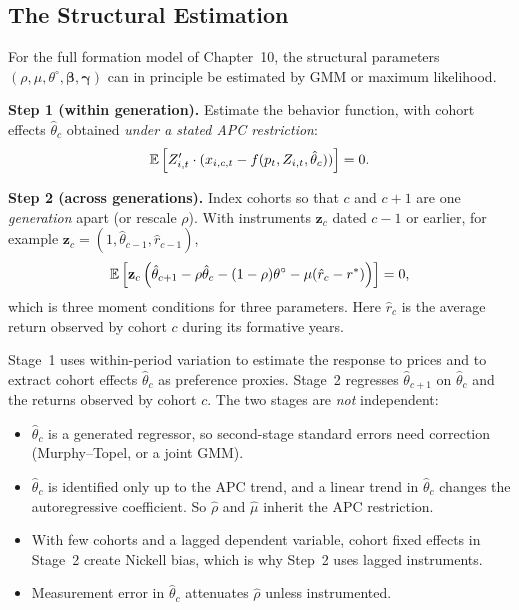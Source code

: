\documentclass[../structural_economics_book.tex]{subfiles}
\begin{document}
\subsection{The Structural Estimation}

For the full formation model of Chapter~10, the structural parameters $(\rho, \mu, \theta^{\circ}, \boldsymbol{\beta}, \boldsymbol{\gamma})$ can in principle be estimated by GMM or maximum likelihood.

\begin{definition}\label{ch11:def:gmm}
\textbf{Step 1 (within generation).} Estimate the behavior function, with cohort effects $\hat{\theta}_c$ obtained \textit{under a stated APC restriction}:
\begin{equation}
\mathbb{E}\left[Z_{i,t}' \cdot (x_{i,c,t} - f(p_t, Z_{i,t}, \hat{\theta}_c))\right] = 0.
\end{equation}

\textbf{Step 2 (across generations).} Index cohorts so that $c$ and $c+1$ are one \textit{generation} apart (or rescale $\rho$). With instruments $\mathbf{z}_c$ dated $c-1$ or earlier, for example $\mathbf{z}_c = (1, \hat{\theta}_{c-1}, \hat{r}_{c-1})$,
\begin{equation}
\mathbb{E}\left[\mathbf{z}_c\left(\hat{\theta}_{c+1} - \rho\hat{\theta}_c - (1-\rho)\theta^{\circ} - \mu(\hat{r}_c - r^*)\right)\right] = 0,
\end{equation}
which is three moment conditions for three parameters. Here $\hat{r}_c$ is the average return observed by cohort $c$ during its formative years.
\end{definition}

\begin{intuition}
Stage~1 uses within-period variation to estimate the response to prices and to extract cohort effects $\hat{\theta}_c$ as preference proxies. Stage~2 regresses $\hat{\theta}_{c+1}$ on $\hat{\theta}_c$ and the returns observed by cohort $c$. The two stages are \textit{not} independent:
\begin{itemize}
\item $\hat{\theta}_c$ is a generated regressor, so second-stage standard errors need correction (Murphy--Topel, or a joint GMM).
\item $\hat{\theta}_c$ is identified only up to the APC trend, and a linear trend in $\hat{\theta}_c$ changes the autoregressive coefficient. So $\hat{\rho}$ and $\hat{\mu}$ inherit the APC restriction.
\item With few cohorts and a lagged dependent variable, cohort fixed effects in Stage~2 create Nickell bias, which is why Step~2 uses lagged instruments.
\item Measurement error in $\hat{\theta}_c$ attenuates $\hat{\rho}$ unless instrumented.
\end{itemize}
\end{intuition}
\end{document}
